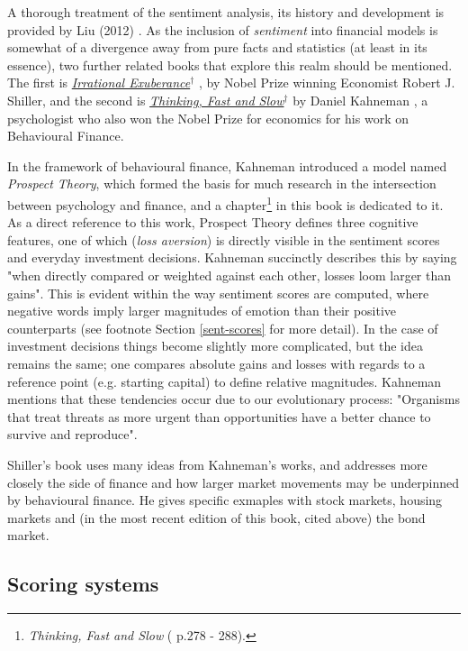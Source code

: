 \documentclass{article}
\begin{document}
\vspace{5mm}
A thorough treatment of the sentiment analysis, its history and development is provided by Liu (2012) \cite{Liu:sentiment-analysis}. As the inclusion of \emph{sentiment} into financial models is somewhat of a divergence away from pure facts and statistics (at least in its essence), two further related books that explore this realm should be mentioned. The first is \href{http://irrationalexuberance.com/main.html?src\%3D\%252F}{\emph{Irrational Exuberance$^{\dag{}}$}} \cite{shiller2015irrational}, by Nobel Prize winning Economist Robert J. Shiller, and the second is \href{https://www.youtube.com/watch?v\%3DmWaIE6u3wvw}{\emph{Thinking, Fast and Slow$^{\dag{}}$}} by Daniel Kahneman \cite{kahneman2011thinking}, a psychologist who also won the Nobel Prize for economics for his work on Behavioural Finance.

In the framework of behavioural finance, Kahneman introduced a model named \emph{Prospect Theory}, which formed the basis for much research in the intersection between psychology and finance, and a chapter\footnote{\emph{Thinking, Fast and Slow} (\cite{kahneman2011thinking} p.278 - 288).} in this book is dedicated to it. As a direct reference to this work, Prospect Theory defines three cognitive features, one of which (\emph{loss aversion}) is directly visible in the sentiment scores and everyday investment decisions. Kahneman succinctly describes this by saying "when directly compared or weighted against each other, losses loom larger than gains". This is evident within the way sentiment scores are computed, where negative words imply larger magnitudes of emotion than their positive counterparts (see footnote Section \ref{sent-scores} for more detail). In the case of investment decisions things become slightly more complicated, but the idea remains the same; one compares absolute gains and losses with regards to a reference point (e.g. starting capital) to define relative magnitudes. Kahneman mentions that these tendencies occur due to our evolutionary process: "Organisms that treat threats as more urgent than opportunities have a better chance to survive and reproduce".

Shiller's book uses many ideas from Kahneman's works, and addresses more closely the side of finance and how larger market movements may be underpinned by behavioural finance. He gives specific exmaples with stock markets, housing markets and (in the most recent edition of this book, cited above) the bond market.


\subsection{Scoring systems \label{sent-scores}}
\label{sec-4-2}
\end{document}
